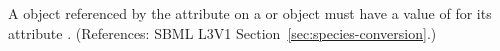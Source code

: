 A \Parameter object referenced by the attribute  on
a \Species or \Model object must have a value of  for its
attribute .  (References: SBML L3V1
Section~\ref{sec:species-conversion}.)
